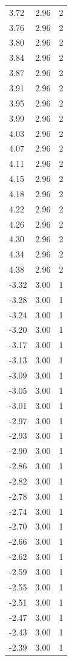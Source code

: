 \begin{longtable}{lrr}
  3.72 & 2.96 & 2 \\
  3.76 & 2.96 & 2 \\
  3.80 & 2.96 & 2 \\
  3.84 & 2.96 & 2 \\
  3.87 & 2.96 & 2 \\
  3.91 & 2.96 & 2 \\
  3.95 & 2.96 & 2 \\
  3.99 & 2.96 & 2 \\
  4.03 & 2.96 & 2 \\
  4.07 & 2.96 & 2 \\
  4.11 & 2.96 & 2 \\
  4.15 & 2.96 & 2 \\
  4.18 & 2.96 & 2 \\
  4.22 & 2.96 & 2 \\
  4.26 & 2.96 & 2 \\
  4.30 & 2.96 & 2 \\
  4.34 & 2.96 & 2 \\
  4.38 & 2.96 & 2 \\
  -3.32 & 3.00 & 1 \\
  -3.28 & 3.00 & 1 \\
  -3.24 & 3.00 & 1 \\
  -3.20 & 3.00 & 1 \\
  -3.17 & 3.00 & 1 \\
  -3.13 & 3.00 & 1 \\
  -3.09 & 3.00 & 1 \\
  -3.05 & 3.00 & 1 \\
  -3.01 & 3.00 & 1 \\
  -2.97 & 3.00 & 1 \\
  -2.93 & 3.00 & 1 \\
  -2.90 & 3.00 & 1 \\
  -2.86 & 3.00 & 1 \\
  -2.82 & 3.00 & 1 \\
  -2.78 & 3.00 & 1 \\
  -2.74 & 3.00 & 1 \\
  -2.70 & 3.00 & 1 \\
  -2.66 & 3.00 & 1 \\
  -2.62 & 3.00 & 1 \\
  -2.59 & 3.00 & 1 \\
  -2.55 & 3.00 & 1 \\
  -2.51 & 3.00 & 1 \\
  -2.47 & 3.00 & 1 \\
  -2.43 & 3.00 & 1 \\
  -2.39 & 3.00 & 1 \\

\end{longtable}
